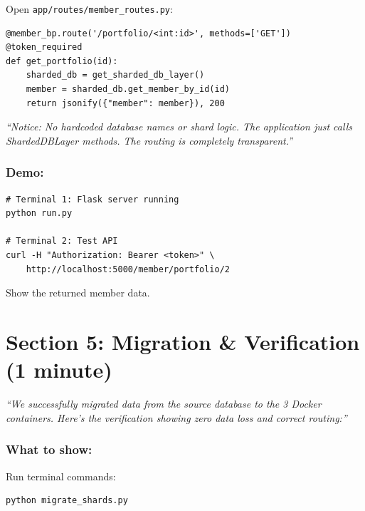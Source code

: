 \documentclass[12pt]{article}
\begin{document}
Open \texttt{app/routes/member\_routes.py}:

\begin{lstlisting}
@member_bp.route('/portfolio/<int:id>', methods=['GET'])
@token_required
def get_portfolio(id):
    sharded_db = get_sharded_db_layer()
    member = sharded_db.get_member_by_id(id)
    return jsonify({"member": member}), 200
\end{lstlisting}

\textit{``Notice: No hardcoded database names or shard logic. The application just calls ShardedDBLayer methods. The routing is completely transparent.''}

\subsubsection*{Demo:}
\begin{lstlisting}
# Terminal 1: Flask server running
python run.py

# Terminal 2: Test API
curl -H "Authorization: Bearer <token>" \
    http://localhost:5000/member/portfolio/2
\end{lstlisting}

Show the returned member data.

\section{Section 5: Migration \& Verification (1 minute)}

\textit{``We successfully migrated data from the source database to the 3 Docker containers. Here's the verification showing zero data loss and correct routing:''}

\subsubsection*{What to show:}

Run terminal commands:

\begin{lstlisting}
python migrate_shards.py
\end{lstlisting}
\end{document}
